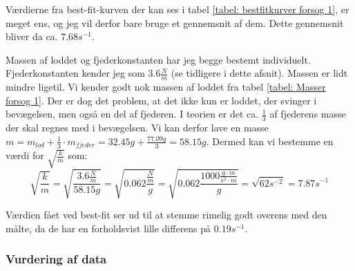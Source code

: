 Værdierne fra best-fit-kurven der kan ses i tabel \ref{tabel: bestfitkurver forsog 1}, er meget ens, og jeg vil derfor bare bruge et gennemsnit af dem. 
Dette gennemsnit bliver da ca. $7.68s^{-1}$.

Massen af loddet og fjederkonstanten har jeg begge bestemt individuelt. 
Fjederkonstanten kender jeg som $3.6\frac{N}{m}$ (se tidligere i dette afsnit). 
Massen er lidt mindre ligetil. 
Vi kender godt nok massen af loddet fra tabel \ref{tabel: Masser forsog 1}. 
Der er dog det problem, at det ikke kun er loddet, der svinger i bevægelsen, men også en del af fjederen. 
I teorien er det ca. $\frac{1}{3}$ af fjederens masse der skal regnes med i bevægelsen.
Vi kan derfor lave en masse $m=m_{lod}+\frac{1}{3}\cdot m_{fjeder}=32.45g+\frac{77.09g}{3}=58.15g$. 
Dermed kan vi bestemme en værdi for $\sqrt{\frac{k}{m}}$ som:
$$\sqrt{\frac{k}{m}}=\sqrt{\frac{3.6\frac{N}{m}}{58.15g}}=\sqrt{0.062\frac{\frac{N}{m}}{g}}=\sqrt{0.062\frac{1000\frac{g\cdot m}{s^2\cdot m}}{g}}=\sqrt{62s^{-2}}=7.87s^{-1}$$

Værdien fået ved best-fit ser ud til at stemme rimelig godt overens med den målte, da de har en forholdsvist lille differens på $0.19s^{-1}$. 



\subsubsection{Vurdering af data}\label{exp1: Vurdering af data}

